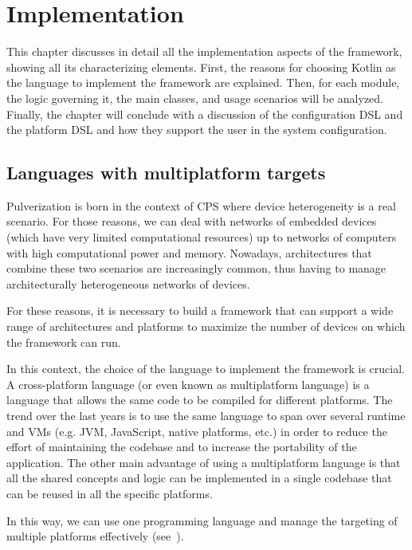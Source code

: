 \chapter{Implementation}
\label{chap:implementation}

This chapter discusses in detail all the implementation aspects of the framework, showing all its characterizing elements.
First, the reasons for choosing Kotlin as the language to implement the framework are explained.
Then, for each module, the logic governing it, the main classes, and usage scenarios will be analyzed.
Finally, the chapter will conclude with a discussion of the configuration DSL and the platform DSL and how they support the user in the system
configuration.

\section{Languages with multiplatform targets}
\label{sec:languages-multiplatform-targets}

Pulverization is born in the context of CPS where device heterogeneity is a real scenario.
For those reasons, we can deal with networks of embedded devices (which have very limited computational resources) up to networks of computers with
high computational power and memory.
Nowadays, architectures that combine these two scenarios are increasingly common, thus having to manage architecturally heterogeneous networks of
devices.

For these reasons, it is necessary to build a framework that can support a wide range of architectures and platforms to maximize the number
of devices on which the framework can run.

In this context, the choice of the language to implement the framework is crucial.
A cross-platform language (or even known as multiplatform language) is a language that allows the same code to be compiled for different platforms.
The trend over the last years is to use the same language to span over several runtime and VMs (e.g. JVM, JavaScript, native platforms, etc.) in order
to reduce the effort of maintaining the codebase and to increase the portability of the application.
The other main advantage of using a multiplatform language is that all the shared concepts and logic can be implemented in a single codebase that
can be reused in all the specific platforms.

In this way, we can use one programming language and manage the targeting of multiple platforms effectively (see~).

